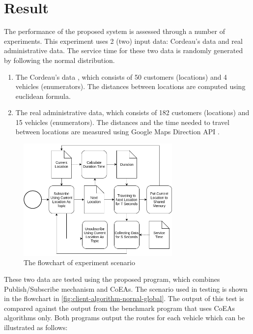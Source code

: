 \documentclass[conference]{IEEEtran}
\begin{document}
\section{Result}
\label{sec:testing}
The performance of the proposed system is assessed through a number of experiments. This experiment uses 2 (two) input data: Cordeau's data and real administrative data. The service time for these two data is randomly generated by following the normal distribution. 


\begin{enumerate}
	\item The Cordeau's data \cite{cordeau_tabu_1997}, which consists of 50 customers (locations) and 4 vehicles (enumerators). The distances between locations are computed using euclidean formula. 
	\item The real administrative data, which consists of 182 customers (locations) and 15 vehicles (enumerators). The distances and the time needed to travel between locations are measured using Google Maps Direction API \cite{google_google_2016}. 
\end{enumerate}


\begin{figure}[!]
	\centering
	\includegraphics[width=8cm]{Resources/Images/client-algorithm-nornal-global}
	\caption{The flowchart of experiment scenario}
	\label{fig:client-algorithm-nornal-global}
\end{figure}


These two data are tested using the proposed program, which combines Publish/Subscribe mechanism and CoEAs. The scenario used in testing is shown in the flowchart in \autoref{fig:client-algorithm-nornal-global}. The output of this test is compared against the output from the benchmark program that uses CoEAs algorithms only. Both programs output the routes for each vehicle which can be illustrated as follows:
\end{document}
